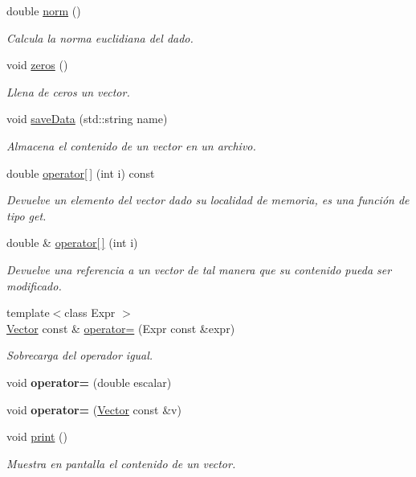 \begin{DoxyCompactItemize}
double \hyperlink{class_vector_a64d1af82e5f8d82c7a6ca5e309c3bf8f}{norm} ()
\begin{DoxyCompactList}\small\item\em Calcula la norma euclidiana del dado. \end{DoxyCompactList}\item 
void \hyperlink{class_vector_a3279c16a264024cf6eb49e6d4cef5ad5}{zeros} ()
\begin{DoxyCompactList}\small\item\em Llena de ceros un vector. \end{DoxyCompactList}\item 
void \hyperlink{class_vector_a5800036c27dc546cd7db4365d8ce206a}{save\+Data} (std\+::string name)
\begin{DoxyCompactList}\small\item\em Almacena el contenido de un vector en un archivo. \end{DoxyCompactList}\item 
double \hyperlink{class_vector_a2fa24314ea9397e50c47484705952a55}{operator\mbox{[}$\,$\mbox{]}} (int i) const
\begin{DoxyCompactList}\small\item\em Devuelve un elemento del vector dado su localidad de memoria, es una función de tipo get. \end{DoxyCompactList}\item 
double \& \hyperlink{class_vector_a8cc4aefe1d880f18feac3426ea8d933e}{operator\mbox{[}$\,$\mbox{]}} (int i)
\begin{DoxyCompactList}\small\item\em Devuelve una referencia a un vector de tal manera que su contenido pueda ser modificado. \end{DoxyCompactList}\item 
{\footnotesize template$<$class Expr $>$ }\\\hyperlink{class_vector}{Vector} const  \& \hyperlink{class_vector_aa53aac2803bd8fd85ddb426b7d9f2978}{operator=} (Expr const \&expr)
\begin{DoxyCompactList}\small\item\em Sobrecarga del operador igual. \end{DoxyCompactList}\item 
\hypertarget{class_vector_af9c482bf8d0dd412d5f9c4a0b091de72}{}\label{class_vector_af9c482bf8d0dd412d5f9c4a0b091de72} 
void {\bfseries operator=} (double escalar)
\item 
\hypertarget{class_vector_af4b830daed2aedd67659a37ccd718aca}{}\label{class_vector_af4b830daed2aedd67659a37ccd718aca} 
void {\bfseries operator=} (\hyperlink{class_vector}{Vector} const \&v)
\item 
void \hyperlink{class_vector_aca4bf268bf617179662f3e04f6926d07}{print} ()
\begin{DoxyCompactList}\small\item\em Muestra en pantalla el contenido de un vector. \end{DoxyCompactList}\end{DoxyCompactItemize}
